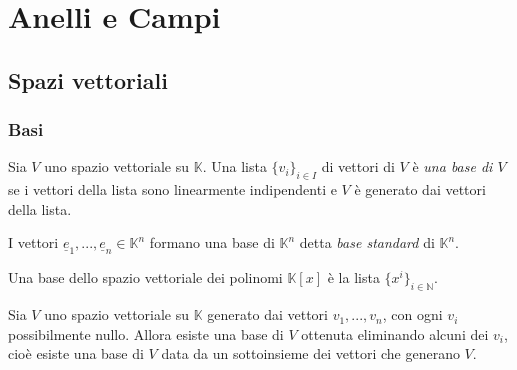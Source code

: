 


  \chapter{Anelli e Campi}\label{chap:anelli_e_campi} %
  \section{Spazi vettoriali}\label{sec:spazi_vettoriali} %
  \subsection{Basi}\label{sub:basi} %
  \begin{definizione*}
    Sia $V$ uno spazio vettoriale su $\mathbb{K}$. Una lista $\{v_i\}_{i\in I}$ di vettori di $V$ è \textit{una base di $V$} se i vettori della lista sono linearmente indipendenti e $V$ è generato dai vettori della lista.
  \end{definizione*}
  \begin{esempio}
    I vettori $\underline{e}_1,...,\underline{e}_n\in \mathbb{K}^n$ formano una base di $\mathbb{K}^n$ detta \textit{base standard} di $\mathbb{K}^n$.
  \end{esempio}
  \begin{esempio}
    Una base dello spazio vettoriale dei polinomi $\mathbb{K}[x]$ è la lista $\{x^i\}_{i\in \mathbb{N}}$.
  \end{esempio}
  \begin{proposizione}
    Sia $V$ uno spazio vettoriale su $\mathbb{K}$ generato dai vettori $v_1,...,v_n$, con ogni $v_i$ possibilmente nullo. Allora esiste una base di $V$ ottenuta eliminando alcuni dei $v_i$, cioè esiste una base di $V$ data da un sottoinsieme dei vettori che generano $V$.
  \end{proposizione}
